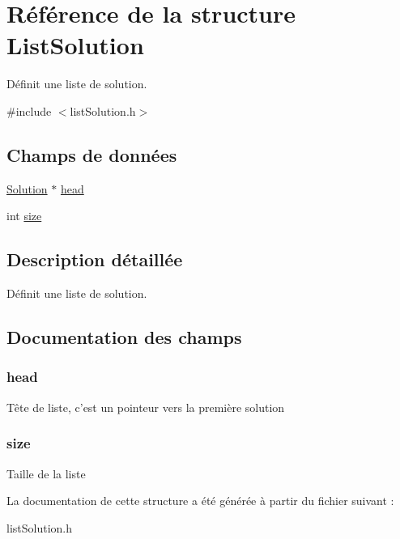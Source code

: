 \hypertarget{struct_list_solution}{\section{Référence de la structure List\-Solution}
\label{struct_list_solution}
}


Définit une liste de solution.  




{\ttfamily \#include $<$list\-Solution.\-h$>$}

\subsection*{Champs de données}
\begin{DoxyCompactItemize}
\item 
\hyperlink{struct_solution}{Solution} $\ast$ \hyperlink{struct_list_solution_a434acd167ada209c34621739b6b8c583}{head}
\item 
int \hyperlink{struct_list_solution_aa3d6656320f1a7278c0c2c7fdf07617c}{size}
\end{DoxyCompactItemize}


\subsection{Description détaillée}
Définit une liste de solution. 

\subsection{Documentation des champs}
\hypertarget{struct_list_solution_a434acd167ada209c34621739b6b8c583}{
\subsubsection[{head}]{\setlength{\rightskip}{0pt plus 5cm}head}}\label{struct_list_solution_a434acd167ada209c34621739b6b8c583}
Tête de liste, c'est un pointeur vers la première solution \hypertarget{struct_list_solution_aa3d6656320f1a7278c0c2c7fdf07617c}{
\subsubsection[{size}]{\setlength{\rightskip}{0pt plus 5cm}size}}\label{struct_list_solution_aa3d6656320f1a7278c0c2c7fdf07617c}
Taille de la liste 

La documentation de cette structure a été générée à partir du fichier suivant \-:\begin{DoxyCompactItemize}
\item 
list\-Solution.\-h\end{DoxyCompactItemize}
